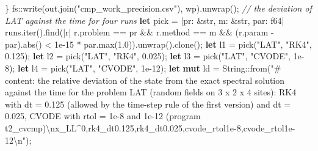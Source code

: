 \documentclass[
  10pt,
]{article}
\newenvironment{Shaded}{}{}
\newcommand{\CommentTok}[1]{\textcolor[rgb]{0.38,0.63,0.69}{\textit{#1}}}
\newcommand{\DataTypeTok}[1]{\textcolor[rgb]{0.56,0.13,0.00}{#1}}
\newcommand{\DecValTok}[1]{\textcolor[rgb]{0.25,0.63,0.44}{#1}}
\newcommand{\KeywordTok}[1]{\textcolor[rgb]{0.00,0.44,0.13}{\textbf{#1}}}
\newcommand{\NormalTok}[1]{#1}
\newcommand{\OperatorTok}[1]{\textcolor[rgb]{0.40,0.40,0.40}{#1}}
\newcommand{\PreprocessorTok}[1]{\textcolor[rgb]{0.74,0.48,0.00}{#1}}
\newcommand{\SpecialCharTok}[1]{\textcolor[rgb]{0.25,0.44,0.63}{#1}}
\newcommand{\StringTok}[1]{\textcolor[rgb]{0.25,0.44,0.63}{#1}}
\begin{document}
\begin{Shaded}
\begin{Highlighting}[]
    \OperatorTok{\}}
    \PreprocessorTok{fs::}\NormalTok{write(out}\OperatorTok{.}\NormalTok{join(}\StringTok{"cmp\_work\_precision.csv"}\NormalTok{)}\OperatorTok{,}\NormalTok{ wp)}\OperatorTok{.}\NormalTok{unwrap()}\OperatorTok{;}
    \CommentTok{// the deviation of LAT against the time for four runs}
    \KeywordTok{let}\NormalTok{ pick }\OperatorTok{=} \OperatorTok{|}\NormalTok{pr}\OperatorTok{:} \OperatorTok{\&}\DataTypeTok{str}\OperatorTok{,}\NormalTok{ m}\OperatorTok{:} \OperatorTok{\&}\DataTypeTok{str}\OperatorTok{,}\NormalTok{ par}\OperatorTok{:} \DataTypeTok{f64}\OperatorTok{|}\NormalTok{ runs}\OperatorTok{.}\NormalTok{iter()}\OperatorTok{.}\NormalTok{find(}\OperatorTok{|}\NormalTok{r}\OperatorTok{|}\NormalTok{ r}\OperatorTok{.}\NormalTok{problem }\OperatorTok{==}\NormalTok{ pr }\OperatorTok{\&\&}\NormalTok{ r}\OperatorTok{.}\NormalTok{method }\OperatorTok{==}\NormalTok{ m }\OperatorTok{\&\&}\NormalTok{ (r}\OperatorTok{.}\NormalTok{param }\OperatorTok{{-}}\NormalTok{ par)}\OperatorTok{.}\NormalTok{abs() }\OperatorTok{\textless{}} \DecValTok{1e{-}15} \OperatorTok{*}\NormalTok{ par}\OperatorTok{.}\NormalTok{max(}\DecValTok{1.0}\NormalTok{))}\OperatorTok{.}\NormalTok{unwrap()}\OperatorTok{.}\NormalTok{clone()}\OperatorTok{;}
    \KeywordTok{let}\NormalTok{ l1 }\OperatorTok{=}\NormalTok{ pick(}\StringTok{"LAT"}\OperatorTok{,} \StringTok{"RK4"}\OperatorTok{,} \DecValTok{0.125}\NormalTok{)}\OperatorTok{;}
    \KeywordTok{let}\NormalTok{ l2 }\OperatorTok{=}\NormalTok{ pick(}\StringTok{"LAT"}\OperatorTok{,} \StringTok{"RK4"}\OperatorTok{,} \DecValTok{0.025}\NormalTok{)}\OperatorTok{;}
    \KeywordTok{let}\NormalTok{ l3 }\OperatorTok{=}\NormalTok{ pick(}\StringTok{"LAT"}\OperatorTok{,} \StringTok{"CVODE"}\OperatorTok{,} \DecValTok{1e{-}8}\NormalTok{)}\OperatorTok{;}
    \KeywordTok{let}\NormalTok{ l4 }\OperatorTok{=}\NormalTok{ pick(}\StringTok{"LAT"}\OperatorTok{,} \StringTok{"CVODE"}\OperatorTok{,} \DecValTok{1e{-}12}\NormalTok{)}\OperatorTok{;}
    \KeywordTok{let} \KeywordTok{mut}\NormalTok{ ld }\OperatorTok{=} \DataTypeTok{String}\PreprocessorTok{::}\NormalTok{from(}\StringTok{"\# content: the relative deviation of the state from the exact spectral solution against the time for the problem LAT (random fields on 3 x 2 x 4 sites): RK4 with dt = 0.125 (allowed by the time{-}step rule of the first version) and dt = 0.025, CVODE with rtol = 1e{-}8 and 1e{-}12 (program t2\_cvcmp)}\SpecialCharTok{\textbackslash{}n}\StringTok{x\_LL\^{}0,rk4\_dt0.125,rk4\_dt0.025,cvode\_rtol1e{-}8,cvode\_rtol1e{-}12}\SpecialCharTok{\textbackslash{}n}\StringTok{"}\NormalTok{)}\OperatorTok{;}

\end{Highlighting}
\end{Shaded}
\end{document}
